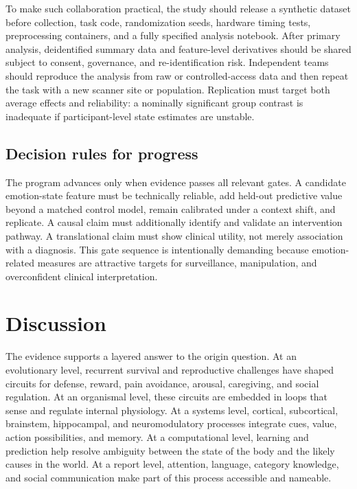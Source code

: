 \documentclass[conference]{IEEEtran}
\begin{document}
To make such collaboration practical, the study should release a synthetic dataset before collection, task code, randomization seeds, hardware timing tests, preprocessing containers, and a fully specified analysis notebook. After primary analysis, deidentified summary data and feature-level derivatives should be shared subject to consent, governance, and re-identification risk. Independent teams should reproduce the analysis from raw or controlled-access data and then repeat the task with a new scanner site or population. Replication must target both average effects and reliability: a nominally significant group contrast is inadequate if participant-level state estimates are unstable.

\subsection{Decision rules for progress}

The program advances only when evidence passes all relevant gates. A candidate emotion-state feature must be technically reliable, add held-out predictive value beyond a matched control model, remain calibrated under a context shift, and replicate. A causal claim must additionally identify and validate an intervention pathway. A translational claim must show clinical utility, not merely association with a diagnosis. This gate sequence is intentionally demanding because emotion-related measures are attractive targets for surveillance, manipulation, and overconfident clinical interpretation.

\section{Discussion}

The evidence supports a layered answer to the origin question. At an evolutionary level, recurrent survival and reproductive challenges have shaped circuits for defense, reward, pain avoidance, arousal, caregiving, and social regulation. At an organismal level, these circuits are embedded in loops that sense and regulate internal physiology. At a systems level, cortical, subcortical, brainstem, hippocampal, and neuromodulatory processes integrate cues, value, action possibilities, and memory. At a computational level, learning and prediction help resolve ambiguity between the state of the body and the likely causes in the world. At a report level, attention, language, category knowledge, and social communication make part of this process accessible and nameable.
\end{document}
